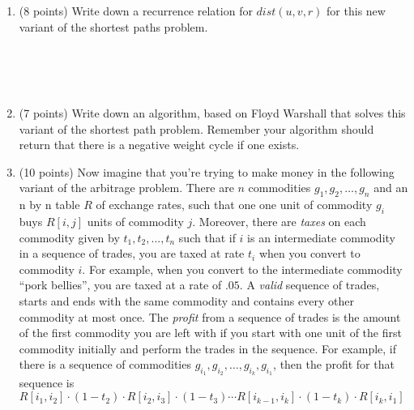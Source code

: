 \documentclass[11pt]{article}
\newcommand{\ans}[1]{ }
\begin{document}
\begin{enumerate}
\begin{enumerate}
\item (8 points) Write down a recurrence relation for $dist(u,v,r)$ for this new variant of the shortest paths problem. 

\ans{$dist(u,v,r) = w(u \rightarrow v)$ if $r=0$\\ else $dist(u,v,r) = min (dist(u,v,r-1), dist(u,r,r-1) + dist(r,v,r-1) + w'(r)$)}  \ \\ \ \\ \ \\ 

\pagebreak

\item (7 points) Write down an algorithm, based on Floyd Warshall that solves this variant of the shortest path problem.  Remember your algorithm should return that there is a negative weight cycle if one exists.

\ans{Run the lecture notes Floyd Warshall with the above recurrence.  Then at the end, check $dist(u,u,n)$ for all nodes $u$, if any of these values are negative, output that there is a negative weight cycle.}


\pagebreak

\item (10 points) Now imagine that you're trying to make money in the following variant of the arbitrage problem.  There are $n$ commodities $g_{1}, g_{2}, \ldots, g_{n}$ and an n by n table $R$ of exchange rates, such that one one unit of commodity $g_{i}$ buys $R[i,j]$ units of commodity $j$.  Moreover, there are \emph{taxes} on each commodity given by $t_{1}, t_{2}, ..., t_{n}$ such that if $i$ is an intermediate commodity in a sequence of trades, you are taxed at rate $t_{i}$ when you convert to commodity $i$.  For example, when you convert to the intermediate commodity ``pork bellies'', you are taxed at a rate of $.05$.  A \emph{valid} sequence of trades, starts and ends with the same commodity and contains every other commodity at most once.   The \emph{profit} from a sequence of trades is the amount of the first commodity you are left with if you start with one unit of the first commodity initially and perform the trades in the sequence.  For example, if there is a sequence of commodities $g_{i_{1}}, g_{i_{2}}, \ldots, g_{i_{k}}, g_{i_{1}}$, then the profit for that sequence is\\ $R[i_{1},i_{2}]\cdot (1 - t_{2}) \cdot R[i_{2}, i_{3}] \cdot(1 -  t_{3}) \cdots R[i_{k-1},i_{k}] \cdot (1- t_{k}) \cdot R[i_{k},i_{1}]$


\end{enumerate}
\end{enumerate}
\end{document}
